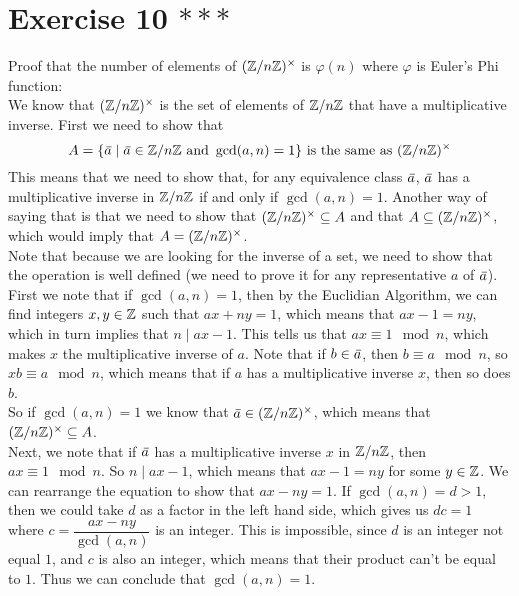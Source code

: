 \documentclass[12pt]{article}
\begin{document}
    \section*{Exercise 10 $***$}
    Proof that the number of elements of $(\mathbb{Z}/n\mathbb{Z})^\times$
    is $\varphi(n)$ where $\varphi$ is Euler's Phi function: \\
    We know that $(\mathbb{Z}/n\mathbb{Z})^\times$ is the set of elements of $\mathbb{Z}/n\mathbb{Z}$
    that have a multiplicative inverse.
    First we need to show that 
    \[ A = \{ \,\overline{\!{a}} \mid \,\overline{\!{a}} \in \mathbb{Z}/n\mathbb{Z}
    \text{ and } \gcd(a, n) = 1 \} 
    \text{ is the same as } (\mathbb{Z}/n\mathbb{Z})^\times \]
    This means that we need to show that,
    for any equivalence class $\,\overline{\!{a}}$,
    $\,\overline{\!{a}}$ has a multiplicative inverse in $\mathbb{Z}/n\mathbb{Z}$
    if and only if $\gcd(a, n) = 1$.
    Another way of saying that is that we need to show
    that $(\mathbb{Z}/n\mathbb{Z})^\times \subseteq A$
    and that $A \subseteq (\mathbb{Z}/n\mathbb{Z})^\times$,
    which would imply that $A = (\mathbb{Z}/n\mathbb{Z})^\times$. \\
    Note that because we are looking for the inverse of a set,
    we need to show that the operation is well defined
    (we need to prove it for any representative $a$ of $\,\overline{\!{a}}$). \\
    First we note that if $\gcd(a, n) = 1$,
    then by the Euclidian Algorithm, we can find integers $x, y \in \mathbb{Z}$
    such that $ax + ny = 1$,
    which means that $ax - 1 = ny$,
    which in turn implies that $n \mid ax - 1$.
    This tells us that $ax \equiv 1 \mod n$,
    which makes $x$ the multiplicative inverse of $a$.
    Note that if $b \in \,\overline{\!{a}}$,
    then $b \equiv a \mod n$,
    so $xb \equiv a \mod n$,
    which means that if $a$ has a multiplicative inverse $x$,
    then so does $b$. \\
    So if $\gcd(a, n) = 1$
    we know that $\,\overline{\!{a}} \in (\mathbb{Z}/n\mathbb{Z})^\times$,
    which means that $(\mathbb{Z}/n\mathbb{Z})^\times \subseteq A$. \\
    Next, we note that if $\,\overline{\!{a}}$ has a multiplicative inverse
    $x$ in $\mathbb{Z}/n\mathbb{Z}$,
    then $ax \equiv 1 \mod n$.
    So $n \mid ax - 1$,
    which means that $ax - 1 = ny$ for some $y \in \mathbb{Z}$.
    We can rearrange the equation to show that $ax - ny = 1$.
    If $\gcd(a, n) = d > 1$,
    then we could take $d$ as a factor in the left hand side,
    which gives us $dc = 1$ where $c = \dfrac{ax - ny}{\gcd(a, n)}$
    is an integer.
    This is impossible,
    since $d$ is an integer not equal $1$,
    and $c$ is also an integer,
    which means that their product can't be equal to $1$.
    Thus we can conclude that $\gcd(a, n) = 1$.
\end{document}

